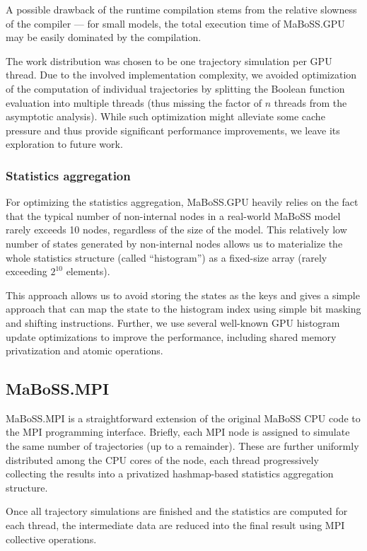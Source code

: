 \documentclass[sn-mathphys-num]{sn-jnl}%
\begin{document}
A possible drawback of the runtime compilation stems from the relative slowness of the compiler --- for small models, the total execution time of MaBoSS.GPU may be easily dominated by the compilation.

The work distribution was chosen to be one trajectory simulation per GPU thread. Due to the involved implementation complexity, we avoided optimization of the computation of individual trajectories by splitting the Boolean function evaluation into multiple threads (thus missing the factor of $n$ threads from the asymptotic analysis). While such optimization might alleviate some cache pressure and thus provide significant performance improvements, we leave its exploration to future work.

\subsubsection*{Statistics aggregation}

For optimizing the statistics aggregation, MaBoSS.GPU heavily relies on the fact that the typical number of non-internal nodes in a real-world MaBoSS model rarely exceeds 10 nodes, regardless of the size of the model. This relatively low number of states generated by non-internal nodes allows us to materialize the whole statistics structure (called ``histogram'') as a fixed-size array (rarely exceeding $2^{10}$ elements).

This approach allows us to avoid storing the states as the keys and gives a simple approach that can map the state to the histogram index using simple bit masking and shifting instructions. Further, we use several well-known GPU histogram update optimizations to improve the performance, including shared memory privatization and atomic operations.

\subsection{MaBoSS.MPI}

MaBoSS.MPI is a straightforward extension of the original MaBoSS CPU code to the MPI programming interface.
Briefly, each MPI node is assigned to simulate the same number of trajectories (up to a remainder). These are further uniformly distributed among the CPU cores of the node, each thread progressively collecting the results into a privatized hashmap-based statistics aggregation structure. 

Once all trajectory simulations are finished and the statistics are computed for each thread, the intermediate data are reduced into the final result using MPI collective operations.
\end{document}
